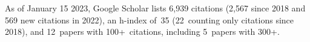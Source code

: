 %
As of January 15 2023, Google Scholar lists
6,939 citations (2,567 since 2018 and 569 new citations in 2022),
an h-index of~35 (22~counting only citations since 2018),
and 12~papers with 100+~citations, including 5~papers with 300+.
